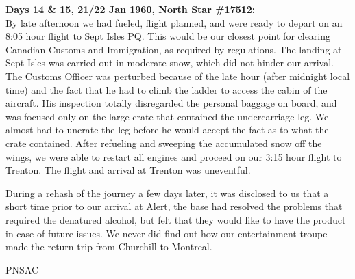 \noindent\textbf{Days 14 \& 15, 21/22 Jan 1960, North Star \#17512:}\\

By late afternoon we had fueled, flight planned, and were ready to
depart on an 8:05 hour flight to Sept Isles PQ. This would be our
closest point for clearing Canadian Customs and Immigration, as
required by regulations. The landing at Sept Isles was carried out in
moderate snow, which did not hinder our arrival. The Customs Officer
was perturbed because of the late hour (after midnight local time) and
the fact that he had to climb the ladder to access the cabin of the
aircraft. His inspection totally disregarded the personal baggage on
board, and was focused only on the large crate that contained the
undercarriage leg. We almost had to uncrate the leg before he would
accept the fact as to what the crate contained. After refueling and
sweeping the accumulated snow off the wings, we were able to restart
all engines and proceed on our 3:15 hour flight to Trenton. The flight
and arrival at Trenton was uneventful.

During a rehash of the journey a few days later, it was disclosed to us
that a short time prior to our arrival at Alert, the base had resolved
the problems that required the denatured alcohol, but felt that they
would like to have the product in case of future issues. We never did
find out how our entertainment troupe made the return trip from
Churchill to Montreal. 

%





\begin{footnotesize}
    \raggedleft PNSAC\\
\end{footnotesize}



